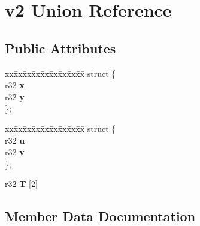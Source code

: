 \hypertarget{unionv2}{}\section{v2 Union Reference}
\label{unionv2}
\subsection*{Public Attributes}
\begin{DoxyCompactItemize}
\item 
\mbox{\label{unionv2_a9973de707fa6afc41c67007de31f7f9d}} 
\begin{tabbing}
xx\=xx\=xx\=xx\=xx\=xx\=xx\=xx\=xx\=\kill
struct \{\\
\mbox{\label{unionv2_a208fbec8d559720719fe4b973fbd37b1}} 
r32 {\bfseries x}\\
\mbox{\label{unionv2_aa67e08877ab5b9609665dc1d56fa15f4}} 
r32 {\bfseries y}\\
\}; \\

\end{tabbing}\item 
\mbox{\label{unionv2_abaa590c45431f6a06750196f8775a60f}} 
\begin{tabbing}
xx\=xx\=xx\=xx\=xx\=xx\=xx\=xx\=xx\=\kill
struct \{\\
\mbox{\label{unionv2_aeac8e675916c37ca0cd49e2527668228}} 
r32 {\bfseries u}\\
\mbox{\label{unionv2_a4f57caa845d978fd3f877f852bd1bdc7}} 
r32 {\bfseries v}\\
\}; \\

\end{tabbing}\item 
\mbox{\label{unionv2_a64c84ca2180167d5b2966dc34c4396a7}} 
r32 {\bfseries T} \mbox{[}2\mbox{]}
\end{DoxyCompactItemize}


\subsection{Member Data Documentation}
\mbox{\label{unionv2_a9973de707fa6afc41c67007de31f7f9d}} 

